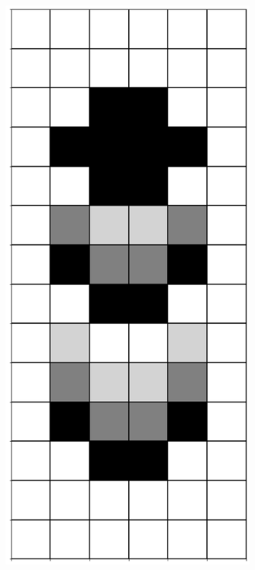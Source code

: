 \documentclass[12pt]{article}
\numberwithin{figure}{section} %
\begin{document}
\begin{figure}[H]
\begin{subfigure}{0.18\textwidth}
     		\subcaption{}
   	\end{subfigure}
        	\begin{subfigure}{0.18\textwidth}
     		\centering
     		\includegraphics[width=\linewidth]{Section4/34.3}

\end{subfigure}
\end{figure}
\end{document}
